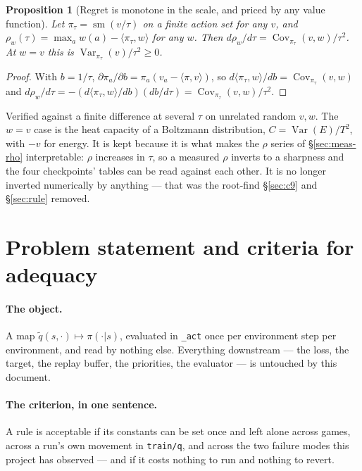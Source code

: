 \documentclass{article}
\DeclareMathOperator{\sm}{sm}
\DeclareMathOperator{\Var}{Var}
\DeclareMathOperator{\Cov}{Cov}
\newcommand{\ip}[2]{\langle #1, #2 \rangle}
\newtheorem{proposition}{Proposition}
\begin{document}
\begin{proposition}[Regret is monotone in the scale, and priced by any value function]
\label{prop:rho}
Let $\pi_\tau = \sm(v/\tau)$ on a finite action set for any $v$, and
$\rho_w(\tau) = \max_a w(a) - \ip{\pi_\tau}{w}$ for any $w$. Then
$d\rho_w/d\tau = \Cov_{\pi_\tau}(v,w)/\tau^{2}$. At $w = v$ this is
$\Var_{\pi_\tau}(v)/\tau^{2} \ge 0$.
\end{proposition}
\begin{proof}
With $b = 1/\tau$, $\partial\pi_a/\partial b = \pi_a(v_a - \ip{\pi}{v})$, so
$d\ip{\pi_\tau}{w}/db = \Cov_{\pi_\tau}(v,w)$ and
$d\rho_w/d\tau = -(d\ip{\pi_\tau}{w}/db)(db/d\tau) = \Cov_{\pi_\tau}(v,w)/\tau^{2}$.
\end{proof}

Verified against a finite difference at several $\tau$ on unrelated random $v, w$. The $w = v$
case is the heat capacity of a Boltzmann distribution, $C = \Var(E)/T^{2}$, with $-v$ for energy.
It is kept because it is what makes the $\rho$ series of \S\ref{sec:meas-rho} interpretable:
$\rho$ increases in $\tau$, so a measured $\rho$ inverts to a sharpness and the four checkpoints'
tables can be read against each other. It is no longer inverted numerically by anything --- that
was the root-find \S\ref{sec:c9} and \S\ref{sec:rule} removed.


\section{Problem statement and criteria for adequacy}
\label{sec:obj}

\paragraph{The object.} A map $\tilde{q}(s,\cdot) \mapsto \pi(\cdot|s)$, evaluated in
\texttt{\_act} once per environment step per environment, and read by nothing else. Everything
downstream --- the loss, the target, the replay buffer, the priorities, the evaluator --- is
untouched by this document.

\paragraph{The criterion, in one sentence.} A rule is acceptable if its constants can be set once
and left alone across games, across a run's own movement in \texttt{train/q}, and
across the two failure modes this project has observed --- and if it costs nothing to run and
nothing to revert.
\end{document}
